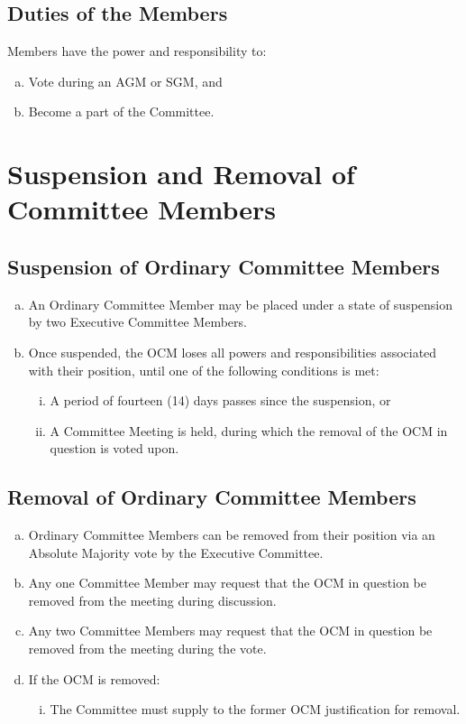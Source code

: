 \documentclass[a4paper,12pt]{article}
\begin{document}
\subsection{Duties of the Members}

Members have the power and responsibility to:

\begin{enumerate}[a)]
	\item Vote during an AGM or SGM, and
	\item Become a part of the Committee.
\end{enumerate}

\section{Suspension and Removal of Committee Members}

\subsection{Suspension of Ordinary Committee Members}

\begin{enumerate}[a)]
	\item An Ordinary Committee Member may be placed under a state of suspension by two Executive Committee Members.
	\item Once suspended, the OCM loses all powers and responsibilities associated with their position, until one of the following conditions is met:
	\begin{enumerate}[i)]
		\item A period of fourteen (14) days passes since the suspension, or
		\item A Committee Meeting is held, during which the removal of the OCM in question is voted upon.
	\end{enumerate}
\end{enumerate}

\subsection{Removal of Ordinary Committee Members}

\begin{enumerate}[a)]
	\item Ordinary Committee Members can be removed from their position via an Absolute Majority vote by the Executive Committee.
	\item Any one Committee Member may request that the OCM in question be removed from the meeting during discussion.
	\item Any two Committee Members may request that the OCM in question be removed from the meeting during the vote.
	\item If the OCM is removed:
	\begin{enumerate}[i)]
		\item The Committee must supply to the former OCM justification for removal.
	\end{enumerate}
\end{enumerate}
\end{document}
